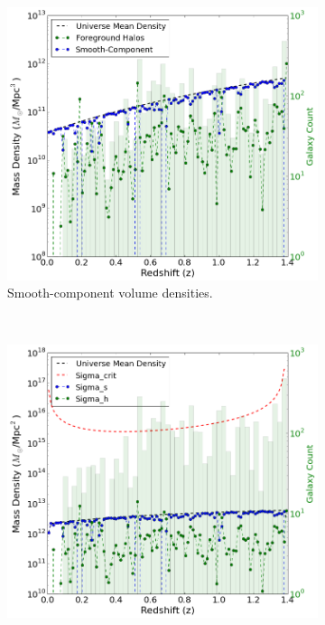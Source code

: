 \documentclass[%
 reprint,
 amsmath,amssymb,
 aps,nofootinbib
]{revtex4-1}
\begin{document}
\begin{figure}
    \centering
    \begin{subfigure}[H]{0.48\textwidth}
        \includegraphics[width=\textwidth]{figs-swe/thesis/vol_densities.png}
        \caption{Smooth-component volume densities.}
        \label{fig:volume_densities}
    \end{subfigure}
    ~
    \begin{subfigure}[H]{0.48\textwidth}
        \includegraphics[width=\textwidth]{figs-swe/thesis/surf_densities.png}

\end{subfigure}
\end{figure}
\end{document}
